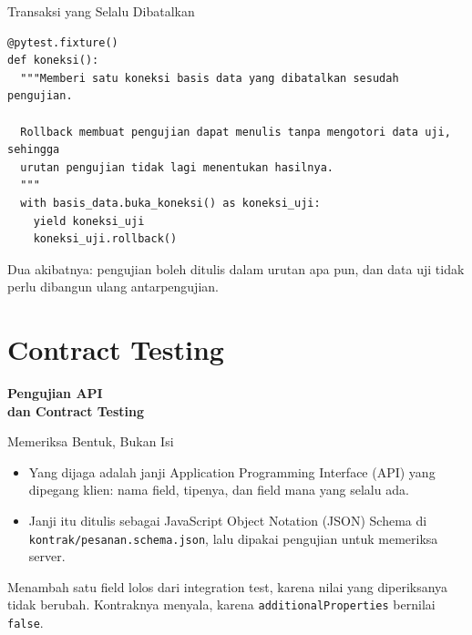 \documentclass[aspectratio=169, table, 12pt]{beamer}
\begin{document}
\begin{frame}[fragile]{{\Large Transaksi yang Selalu Dibatalkan}}
  \vspace{2pt}
\begin{lstlisting}[style=PythonStyle]
@pytest.fixture()
def koneksi():
  """Memberi satu koneksi basis data yang dibatalkan sesudah pengujian.

  Rollback membuat pengujian dapat menulis tanpa mengotori data uji, sehingga
  urutan pengujian tidak lagi menentukan hasilnya.
  """
  with basis_data.buka_koneksi() as koneksi_uji:
    yield koneksi_uji
    koneksi_uji.rollback()
\end{lstlisting}
  \vspace{2pt}
  {\small Dua akibatnya: pengujian boleh ditulis dalam urutan apa pun, dan
  data uji tidak perlu dibangun ulang antarpengujian.}
\end{frame}

\section{Contract Testing}

\begin{frame}{\hfill}
  \centering
  \Huge{\textbf{Pengujian API\\dan Contract Testing}}
\end{frame}

\begin{frame}{{\Large Memeriksa Bentuk, Bukan Isi}}
  \vspace{12pt}
  \begin{itemize}
    \item Yang dijaga adalah janji Application Programming Interface (API)
          yang dipegang klien: nama field, tipenya, dan field mana yang selalu
          ada.
    \item Janji itu ditulis sebagai JavaScript Object Notation (JSON) Schema di
          \texttt{kontrak/pesanan.schema.json}, lalu dipakai pengujian untuk
          memeriksa server.
  \end{itemize}
  \vspace{10pt}
  {\small Menambah satu field lolos dari integration test, karena nilai yang
  diperiksanya tidak berubah. Kontraknya menyala, karena
  \texttt{additionalProperties} bernilai \texttt{false}.}
\end{frame}
\end{document}
